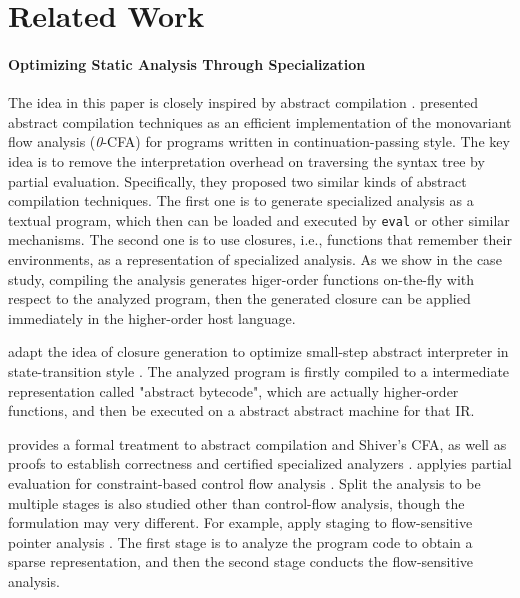 \section{Related Work}

\paragraph{Optimizing Static Analysis Through Specialization}
The idea in this paper is closely inspired by abstract compilation
\cite{Boucher:1996:ACN:647473.727587}.
\citeauthor{Boucher:1996:ACN:647473.727587} presented abstract compilation
techniques as an efficient implementation of the monovariant flow analysis
(\textit{0}-CFA) for programs written in continuation-passing style. The key
idea is to remove the interpretation overhead on traversing the syntax tree by
partial evaluation. Specifically, they proposed two similar kinds of abstract
compilation techniques. The first one is to generate specialized analysis as a
textual program, which then can be loaded and executed by \texttt{eval} or other
similar mechanisms. The second one is to use closures, i.e., functions that
remember their environments, as a representation of specialized analysis. As we
show in the case study, compiling the analysis generates higer-order functions
on-the-fly with respect to the analyzed program, then the generated closure can
be applied immediately in the higher-order host language.

\citeauthor{Johnson:2013:OAA:2500365.2500604} adapt the idea of closure
generation to optimize small-step abstract interpreter in state-transition style
\cite{Johnson:2013:OAA:2500365.2500604}. The analyzed program is firstly
compiled to a intermediate representation called "abstract bytecode", which are
actually higher-order functions, and then be executed on a abstract abstract
machine for that IR.

\citet{damian1999partial} provides a formal treatment to abstract compilation
and Shiver's CFA, as well as proofs to establish correctness and certified
specialized analyzers \cite{damian1999partial}. \citeauthor{amtoft1999partial}
applyies partial evaluation for constraint-based control flow analysis
\cite{amtoft1999partial}. Split the analysis to be multiple stages is also
studied other than control-flow analysis, though the formulation may very
different. For example, \citeauthor{DBLP:conf/cgo/HardekopfL11} apply staging to
flow-sensitive pointer analysis \cite{DBLP:conf/cgo/HardekopfL11}. The first
stage is to analyze the program code to obtain a sparse representation, and then
the second stage conducts the flow-sensitive analysis.

